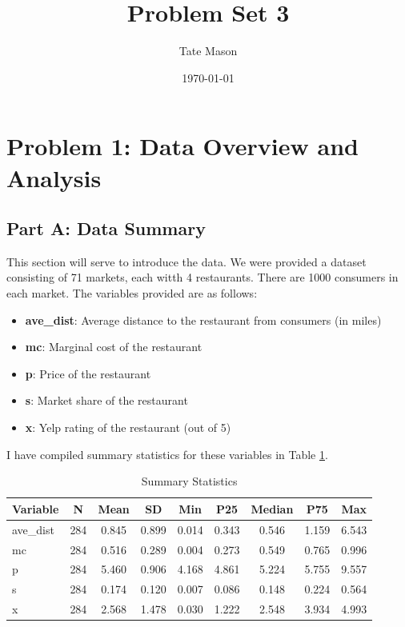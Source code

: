 \documentclass{article}
\begin{document}
\title{Problem Set 3}
\author{Tate Mason}
\date{\today}
\maketitle

\section*{Problem 1: Data Overview and Analysis}

\subsection*{Part A: Data Summary}

This section will serve to introduce the data. We were provided a dataset consisting of 71 markets, each witth 4 restaurants.
There are 1000 consumers in each market. The variables provided are as follows:

\begin{itemize}
  \item \textbf{ave\_dist}: Average distance to the restaurant from consumers (in miles)
  \item \textbf{mc}: Marginal cost of the restaurant
  \item \textbf{p}: Price of the restaurant
  \item \textbf{s}: Market share of the restaurant
  \item \textbf{x}: Yelp rating of the restaurant (out of 5)
\end{itemize}

I have compiled summary statistics for these variables in Table \ref{tab:summ_stats}.

\begin{table}[htbp]
    \centering
    \caption{Summary Statistics}
    \label{tab:summ_stats}
    \begin{tabular}{lcccccccc}
    \hline\hline
    Variable & N & Mean & SD & Min & P25 & Median & P75 & Max \\
    \hline
    ave\_dist & 284 & 0.845 & 0.899 & 0.014 & 0.343 & 0.546 & 1.159 & 6.543 \\
    mc        & 284 & 0.516 & 0.289 & 0.004 & 0.273 & 0.549 & 0.765 & 0.996 \\
    p         & 284 & 5.460 & 0.906 & 4.168 & 4.861 & 5.224 & 5.755 & 9.557 \\
    s         & 284 & 0.174 & 0.120 & 0.007 & 0.086 & 0.148 & 0.224 & 0.564 \\
    x         & 284 & 2.568 & 1.478 & 0.030 & 1.222 & 2.548 & 3.934 & 4.993 \\
    \hline\hline
    \end{tabular}
\end{table}
\end{document}
